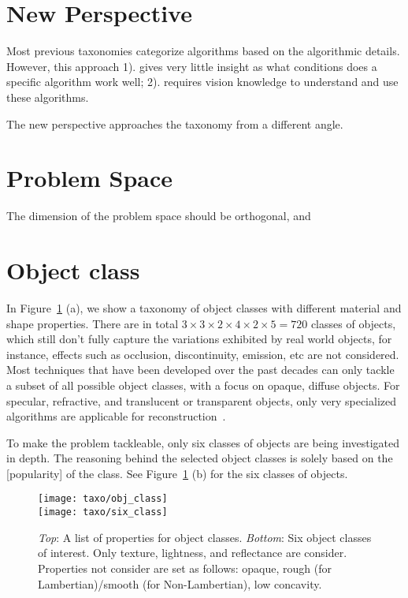 \section{New Perspective}
Most previous taxonomies categorize algorithms based on the algorithmic details. However, this approach 1). gives very little insight as what conditions does a specific algorithm work well; 2). requires vision knowledge to understand and use these algorithms.

The new perspective approaches the taxonomy from a different angle.

\section{Problem Space}
The dimension of the problem space should be orthogonal, and 

\section{Object class}
In Figure~\ref{fig:obj_class} (a), we show a taxonomy of object classes with different material and shape properties. There are in total $3\times 3\times 2\times4\times 2\times 5 = 720$ classes of objects, which still don't fully capture the variations exhibited by real world objects, for instance, effects such as occlusion, discontinuity, emission, etc are not considered. Most techniques that have been developed over the past decades can only tackle a subset of all possible object classes, with a focus on opaque, diffuse objects. For specular, refractive, and translucent or transparent objects, only very specialized algorithms are applicable for reconstruction~\cite{ihrke2010transparent}.

To make the problem tackleable, only six classes of objects are being investigated in depth. The reasoning behind the selected object classes is solely based on the [popularity] of the class. See Figure~\ref{fig:obj_class} (b) for the six classes of objects.
\begin{figure}[!htbp]
\centering
\texttt{[image: taxo/obj\_class]}\\
\texttt{[image: taxo/six\_class]}\\
\caption{\textit{Top}: A list of properties for object classes. \textit{Bottom}: Six object classes of interest. Only texture, lightness, and reflectance are consider. Properties not consider are set as follows: opaque, rough (for Lambertian)/smooth (for Non-Lambertian), low concavity.}
\label{fig:obj_class}
\end{figure}

